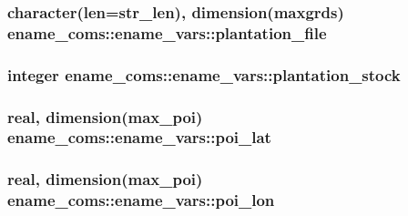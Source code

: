 \subsubsection[{plantation\+\_\+file}]{\setlength{\rightskip}{0pt plus 5cm}character(len=str\+\_\+len), dimension(maxgrds) ename\+\_\+coms\+::ename\+\_\+vars\+::plantation\+\_\+file}\label{structename__coms_1_1ename__vars_a466aacc58395db708dab81248d637b31}
\hypertarget{structename__coms_1_1ename__vars_a3722272c39c92fba801c8c80d4edf1ad}{}
\subsubsection[{plantation\+\_\+stock}]{\setlength{\rightskip}{0pt plus 5cm}integer ename\+\_\+coms\+::ename\+\_\+vars\+::plantation\+\_\+stock}\label{structename__coms_1_1ename__vars_a3722272c39c92fba801c8c80d4edf1ad}
\hypertarget{structename__coms_1_1ename__vars_a1a12085b47e9531b651a936ffbb812a2}{}
\subsubsection[{poi\+\_\+lat}]{\setlength{\rightskip}{0pt plus 5cm}real, dimension(max\+\_\+poi) ename\+\_\+coms\+::ename\+\_\+vars\+::poi\+\_\+lat}\label{structename__coms_1_1ename__vars_a1a12085b47e9531b651a936ffbb812a2}
\hypertarget{structename__coms_1_1ename__vars_af1d56859951803c6fd88df0afc330b3b}{}
\subsubsection[{poi\+\_\+lon}]{\setlength{\rightskip}{0pt plus 5cm}real, dimension(max\+\_\+poi) ename\+\_\+coms\+::ename\+\_\+vars\+::poi\+\_\+lon}\label{structename__coms_1_1ename__vars_af1d56859951803c6fd88df0afc330b3b}
\hypertarget{structename__coms_1_1ename__vars_afc6c9bd25439db1dc68ac52ef510c2c6}{}
